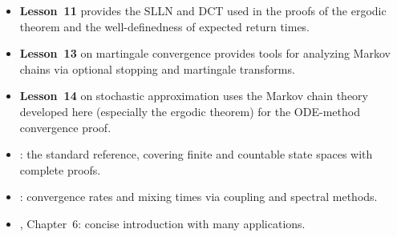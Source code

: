 \documentclass[11pt,a4paper]{article}
\begin{document}
\begin{itemize}[nosep]
  \item \textbf{Lesson~11} provides the SLLN and DCT used in the
    proofs of the ergodic theorem and the well-definedness of
    expected return times.
  \item \textbf{Lesson~13} on martingale convergence provides
    tools for analyzing Markov chains via optional stopping and
    martingale transforms.
  \item \textbf{Lesson~14} on stochastic approximation uses the
    Markov chain theory developed here (especially the ergodic
    theorem) for the ODE-method convergence proof.
  \item \citet{norris1997}: the standard reference, covering
    finite and countable state spaces with complete proofs.
  \item \citet{levin2017}: convergence rates and mixing times
    via coupling and spectral methods.
  \item \citet{grimmett2001}, Chapter~6: concise introduction
    with many applications.
\end{itemize}


\end{document}
